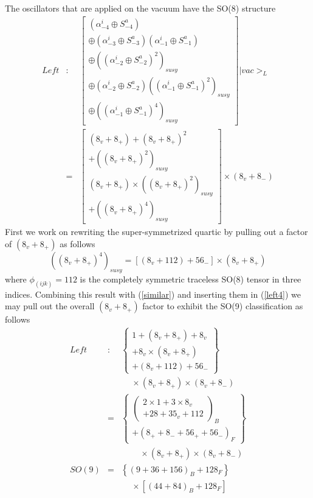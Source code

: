 The oscillators that are applied on the vacuum have the SO(8) structure
\begin{eqnarray}
{Left} &:&\left[
\begin{array}{c}
(\alpha _{-4}^i\oplus S_{-4}^a) \\
\oplus (\alpha _{-3}^i\oplus S_{-3}^a)(\alpha _{-1}^i\oplus S_{-1}^a) \\
\oplus \left( (\alpha _{-2}^i\oplus S_{-2}^a)^2\right) _{susy} \\
\oplus (\alpha _{-2}^i\oplus S_{-2}^a)\left( (\alpha _{-1}^i\oplus
S_{-1}^a)^2\right) _{susy} \\
\oplus \left( (\alpha _{-1}^i\oplus S_{-1}^a)^4\right) _{susy}
\end{array}
\right] |{vac}>_L  \nonumber  \label{left4} \\
&=&\left[
\begin{array}{c}
(8_v+8_{+})+(8_v+8_{+})^2 \\
+\left( (8_v+8_{+})^2\right) _{susy} \\
(8_v+8_{+})\times \left( (8_v+8_{+})^2\right) _{susy} \\
+\left( (8_v+8_{+})^4\right) _{susy}
\end{array}
\right] \times (8_v+8_{-})  \label{left4}
\end{eqnarray}
First we work on rewriting the super-symmetrized quartic by pulling out a
factor of $(8_v+8_{+})$ as follows
\begin{equation}
\left( (8_v+8_{+})^4\right) _{susy}=\left[ \left( 8_v+112\right)
+56_{-}\right] \times (8_v+8_{+})  \label{quartic}
\end{equation}
where $\phi _{(ijk)}=112$ is the completely symmetric traceless SO(8) tensor
in three indices. Combining this result with (\ref{similar}) and inserting
them in (\ref{left4}) we may pull out the overall $(8_v+8_{+})$ factor to
exhibit the SO(9) classification as follows
\begin{eqnarray}
{Left} &:&\left\{
\begin{array}{l}
1+(8_v+8_{+})+8_v \\
+8_v\times (8_v+8_{+}) \\
+\left( 8_v+112\right) +56_{-}
\end{array}
\right\}   \nonumber \\
&&\ \quad \times (8_v+8_{+})\times (8_v+8_{-}) \\
\  &=&\left\{
\begin{array}{l}
\left(
\begin{array}{c}
2\times 1+3\times 8_v \\
+28+35_v+112
\end{array}
\right) _B \\
+\left( 8_{+}+8_{-}+56_{+}+56_{-}\right) _F
\end{array}
\right\}   \nonumber \\
&&\ \quad \quad \times (8_v+8_{+})\times (8_v+8_{-})  \nonumber \\
SO(9) &=&\left\{ (9+36+156)_B+128_F\right\}   \nonumber \\
&&\ \quad \times \left[ \left( 44+84\right) _B+128_F\right]   \nonumber
\end{eqnarray}
